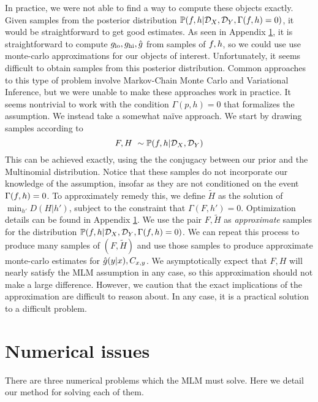 In practice, we were not able to find a way to compute these objects exactly.  Given samples from the posterior distribution $\mathbb{P}(f,h| {\mathcal{D}_X},{\mathcal{D}_Y},\Gamma(f,h)=0)$, it would be straightforward to get good estimates.  As seen in Appendix \ref{sec:optproblems}, it is straightforward to compute $g_{\mathrm{lo}},g_{\mathrm{hi}},\hat {g}$ from samples of $f,h$, so we could use use monte-carlo approximations for our objects of interest.  Unfortunately, it seems difficult to obtain samples from this posterior distribution.   Common approaches to this type of problem involve Markov-Chain Monte Carlo and Variational Inference, but we were unable to make these approaches work in practice.  It seems nontrivial to work with the condition $\Gamma(p,h)=0$ that formalizes the \MLM{} assumption.  We instead take a somewhat na\"ive approach.  We start by drawing samples according to
\[
F,H ~ \sim \mathbb{P}(f,h | {\mathcal{D}_X},{\mathcal{D}_Y})
\]
This can be achieved exactly, using the the conjugacy between our prior and the Multinomial distribution.  Notice that these samples do not incorporate our knowledge of the \MLM{} assumption, insofar as they are not conditioned on the event $\Gamma(f,h)=0$.  To approximately remedy this, we define $\tilde H$ as the solution of $\min_{h'}D(H|h')$, subject to the constraint that $\Gamma(F,h')=0$.  Optimization details can be found in Appendix \ref{sec:optproblems}.  We use the pair $F,\tilde H$ as \emph{approximate} samples for the distribution $\mathbb{P}(f,h| {\mathcal{D}_X},{\mathcal{D}_Y},\Gamma(f,h)=0)$.  We can repeat this process to produce many samples of $(F,\tilde H)$ and use those samples to produce approximate monte-carlo estimates for $\hat {g}(y|x),C_{x,y}$.  We asymptotically expect that $F,H$ will nearly satisfy the MLM assumption in any case, so this approximation should not make a large difference.  However, we caution that the exact implications of the approximation are difficult to reason about.   In any case, it is a practical solution to a difficult problem.

\section{Numerical issues}

\label{sec:optproblems}

There are three numerical problems which the MLM must solve.  Here we detail our method for solving each of them.


